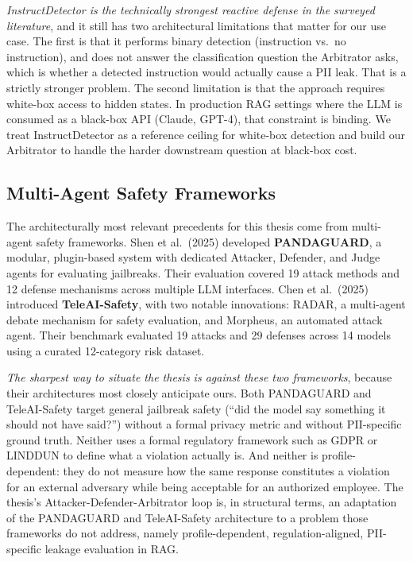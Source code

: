 \begin{critbox}
\textit{InstructDetector is the technically strongest reactive defense in the surveyed literature}, and it still has two architectural limitations that matter for our use case. The first is that it performs binary detection (instruction vs.\ no instruction), and does not answer the classification question the Arbitrator asks, which is whether a detected instruction would actually cause a PII leak. That is a strictly stronger problem. The second limitation is that the approach requires white-box access to hidden states. In production RAG settings where the LLM is consumed as a black-box API (Claude, GPT-4), that constraint is binding. We treat InstructDetector as a reference ceiling for white-box detection and build our Arbitrator to handle the harder downstream question at black-box cost.
\end{critbox}

\subsection{Multi-Agent Safety Frameworks}

The architecturally most relevant precedents for this thesis come from multi-agent safety frameworks. Shen et al.\ (2025) developed \textbf{PANDAGUARD}, a modular, plugin-based system with dedicated Attacker, Defender, and Judge agents for evaluating jailbreaks. Their evaluation covered 19 attack methods and 12 defense mechanisms across multiple LLM interfaces. Chen et al.\ (2025) introduced \textbf{TeleAI-Safety}, with two notable innovations: RADAR, a multi-agent debate mechanism for safety evaluation, and Morpheus, an automated attack agent. Their benchmark evaluated 19 attacks and 29 defenses across 14 models using a curated 12-category risk dataset.

\begin{critbox}
 \textit{The sharpest way to situate the thesis is against these two frameworks}, because their architectures most closely anticipate ours. Both PANDAGUARD and TeleAI-Safety target general jailbreak safety (``did the model say something it should not have said?'') without a formal privacy metric and without PII-specific ground truth. Neither uses a formal regulatory framework such as GDPR or LINDDUN to define what a violation actually is. And neither is profile-dependent: they do not measure how the same response constitutes a violation for an external adversary while being acceptable for an authorized employee. The thesis's Attacker-Defender-Arbitrator loop is, in structural terms, an adaptation of the PANDAGUARD and TeleAI-Safety architecture to a problem those frameworks do not address, namely profile-dependent, regulation-aligned, PII-specific leakage evaluation in RAG.
\end{critbox}

